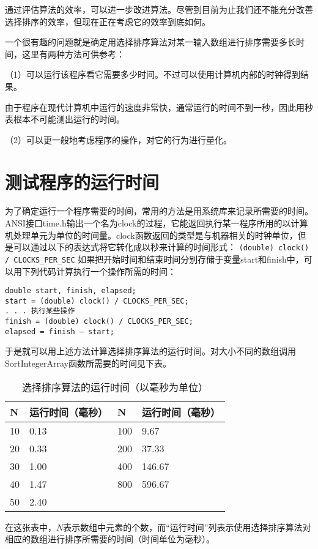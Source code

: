 通过评估算法的效率，可以进一步改进算法。尽管到目前为止我们还不能充分改善选择排序的效率，但现在正在考虑它的效率到底如何。

一个很有趣的问题就是确定用选择排序算法对某一输入数组进行排序需要多长时间，这里有两种方法可供参考：

（1）可以运行该程序看它需要多少时间。不过可以使用计算机内部的时钟得到结果。

由于程序在现代计算机中运行的速度非常快，通常运行的时间不到一秒，因此用秒表根本不可能测出运行的时间。

（2）可以更一般地考虑程序的操作，对它的行为进行量化。

\section{测试程序的运行时间}

为了确定运行一个程序需要的时间，常用的方法是用系统库来记录所需要的时间。ANSI接口time.h输出一个名为clock的过程，它能返回执行某一程序所用的以计算机处理单元为单位的时间量。clock函数返回的类型是与机器相关的时钟单位，但是可以通过以下的表达式将它转化成以秒来计算的时间形式：
\verb|(double) clock() / CLOCKS_PER_SEC|
如果把开始时间和结束时间分别存储于变量start和finish中，可以用下列代码计算执行一个操作所需的时间：
\begin{verbatim}
double start, finish, elapsed;
start = (double) clock() / CLOCKS_PER_SEC;
. . . 执行某些操作
finish = (double) clock() / CLOCKS_PER_SEC;
elapsed = finish – start;
\end{verbatim}

于是就可以用上述方法计算选择排序算法的运行时间。对大小不同的数组调用SortIntegerArray函数所需要的时间见下表。
\begin{table}[!h]
\centering
\caption{选择排序算法的运行时间（以毫秒为单位）}
\begin{tabular}{|l|l|l|l|}
\hline
N 			& 运行时间（毫秒）	& N 				& 运行时间（毫秒）			\\
\hline
10			& 0.13				& 100				& 9.67						\\
\hline
20			& 0.33				& 200				& 37.33						\\
\hline
30			& 1.00				& 400				& 146.67						\\
\hline
40			& 1.47				& 800				& 596.67						\\
\hline
50			& 2.40				& 					& 								\\
\hline
\end{tabular}
\end{table}


在这张表中，$N$表示数组中元素的个数，而“运行时间”列表示使用选择排序算法对相应的数组进行排序所需要的时间（时间单位为毫秒）。


